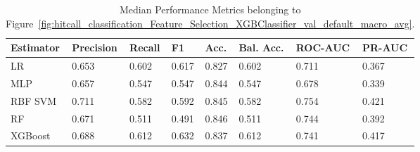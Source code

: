 \begin{longtable}{llllllll}
\caption{Median Performance Metrics belonging to Figure~\ref{fig:hitcall_classification_Feature_Selection_XGBClassifier_val_default_macro_avg}.}\label{tab:table:hitcall_classification_feature_selection_xgbclassifier_val_default_macro_avg}\\
\toprule
\midrule
\small Estimator & \small Precision & \small Recall & \small F1 & \small Acc. & \small Bal. Acc. & \small ROC-AUC & \small PR-AUC\\
\hline
LR & 0.653 & 0.602 & 0.617 & 0.827 & 0.602 & 0.711 & 0.367\\
MLP & 0.657 & 0.547 & 0.547 & 0.844 & 0.547 & 0.678 & 0.339\\
RBF SVM & 0.711 & 0.582 & 0.592 & 0.845 & 0.582 & 0.754 & 0.421\\
RF & 0.671 & 0.511 & 0.491 & 0.846 & 0.511 & 0.744 & 0.392\\
XGBoost & 0.688 & 0.612 & 0.632 & 0.837 & 0.612 & 0.741 & 0.417\\
\bottomrule
\end{longtable}
